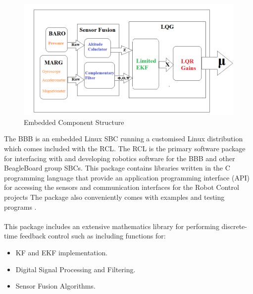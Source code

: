 \documentclass[12pt,a4paper,twoside]{report}
\begin{document}
				\begin{figure}[h!]
					\centering
					\includegraphics[width=1\linewidth]{ImplementationStructure.png}
					\caption{Embedded Component Structure}
					\label{fig:embeddedcomponentstructure}
				\end{figure}
			
				The BBB is an embedded Linux SBC running a customised Linux distribution which comes included with the RCL. The RCL is the primary software package for interfacing with and developing robotics software for the BBB and other BeagleBoard group SBCs. This package contains libraries written in the C programming language that provide an application programming interface (API) for accessing the sensors and communication interfaces for the Robot Control projects \cite{31} The package also conveniently comes with examples and testing programs . 
				\\ \\
				This package includes an extensive mathematics library for performing discrete-time feedback control such as including functions for:
				
				\begin{itemize}
					\item
						KF and EKF implementation.
					\item
						Digital Signal Processing and Filtering.
					\item
						Sensor Fusion Algorithms.
				\end{itemize}  
		
\end{document}

